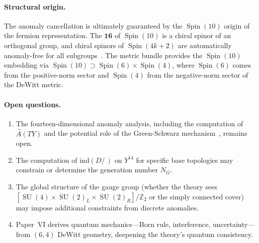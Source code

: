 \documentclass[12pt,a4paper]{article}
\theoremstyle{definition}
\newcommand{\SU}{\operatorname{SU}}
\newcommand{\Spin}{\operatorname{Spin}}
\newcommand{\Z}{\mathbb{Z}}
\begin{document}
\paragraph{Structural origin.}
The anomaly cancellation is ultimately guaranteed by the $\Spin(10)$ origin of the fermion representation.
The $\mathbf{16}$ of $\Spin(10)$ is a chiral spinor of an orthogonal group, and chiral spinors of $\Spin(4k+2)$ are automatically anomaly-free for all subgroups~\cite{BaezHuerta2010}.
The metric bundle provides the $\Spin(10)$ embedding via $\Spin(10) \supset \Spin(6) \times \Spin(4)$, where $\Spin(6)$ comes from the positive-norm sector and $\Spin(4)$ from the negative-norm sector of the DeWitt metric.

\paragraph{Open questions.}
\begin{enumerate}
\item The fourteen-dimensional anomaly analysis, including the computation of $\hat{A}(TY)$ and the potential role of the Green-Schwarz mechanism~\cite{GreenSchwarz1984}, remains open.
\item The computation of $\mathrm{ind}(D\!\!\!\!/\,)$ on $Y^{14}$ for specific base topologies may constrain or determine the generation number $N_G$.
\item The global structure of the gauge group (whether the theory sees $[\SU(4) \times \SU(2)_L \times \SU(2)_R]/\Z_2$ or the simply connected cover) may impose additional constraints from discrete anomalies.
\item Paper~VI \cite{Paper6} derives quantum mechanics---Born rule, interference, uncertainty---from $(6,4)$ DeWitt geometry, deepening the theory's quantum consistency.
\end{enumerate}




\end{document}

